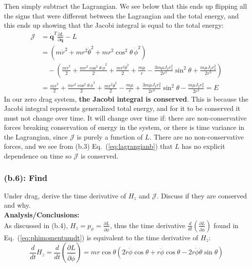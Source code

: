 \documentclass[titlepage]{article}
\begin{document}
\begin{mdframed}[linewidth=1pt, innertopmargin=10pt, innerbottommargin=10pt]
	Then simply subtract the Lagrangian. We see below that this ends up flipping all the signs that were different between the Lagrangian and the total energy, and this ends up showing that the Jacobi integral is equal to the total energy:
	\small
	\begin{equation}
		\begin{split}
			\mathcal{J}&=\dot{\boldsymbol{q}}^T\frac{\partial L}{\partial\dot{\boldsymbol{q}}}-L \\
			&=\left(m\dot{r}^2+mr^2\dot{\theta}^2+mr^2\cos^2\theta\,\dot{\phi}^2\right) \\
			&\quad-\left(\frac{m\dot{r}^2}{2}+\frac{mr^2\cos^2\theta\,\dot{\phi}^2}{2}+\frac{mr^2\dot{\theta}^2}{2}+\frac{m\mu}{r}-\frac{3m\mu J_2r_o^2}{2r^3}\sin^2\theta+\frac{m\mu J_2r_o^2}{2r^3}\right) \\
			&=\frac{m\dot{r}^2}{2}+\frac{mr^2\cos^2\theta\,\dot{\phi}^2}{2}+\frac{mr^2\dot{\theta}^2}{2}-\frac{m\mu}{r}+\frac{3m\mu J_2r_o^2}{2r^3}\sin^2\theta-\frac{m\mu J_2r_o^2}{2r^3}=E
		\end{split}
		\label{eq:jacobiintegral}
	\end{equation}
	\normalsize
	In our zero drag system, \textbf{the Jacobi integral is conserved}. This is because the Jacobi integral represents generalized total energy, and for it to be conserved it must not change over time. It will change over time if: there are non-conservative forces breaking conservation of energy in the system, or there is time variance in the Lagrangian, since $\mathcal{J}$ is purely a function of $L$. There are no non-conservative forces, and we see from (b.3) Eq.~(\ref{eq:lagrangianb}) that $L$ has no explicit dependence on time so $\mathcal{J}$ is conserved.
\end{mdframed}

\newpage

\subsubsection*{(b.6): Find}

Under drag, derive the time derivative of $H_z$ and $\mathcal{J}$. Discuss if they are conserved and why.\\

\textbf{Analysis/Conclusions:}\\

As discussed in (b.4), $H_z=p_\phi=\frac{\partial L}{\partial\dot{\phi}}$, thus the time derivative $\frac{d}{dt}(\frac{\partial L}{\partial\dot{\phi}})$ found in Eq.~(\ref{eq:phimomentumdt}) is equivalent to the time derivative of $H_z$:
\begin{equation}
	\frac{d}{dt}H_z=\frac{d}{dt}\left(\frac{\partial L}{\partial\dot{\phi}}\right)=mr\cos\theta\left(2\dot{r}\dot{\phi}\cos\theta+r\ddot{\phi}\cos\theta-2r\dot{\phi}\dot{\theta}\sin\theta\right)
\end{equation}
\end{document}
